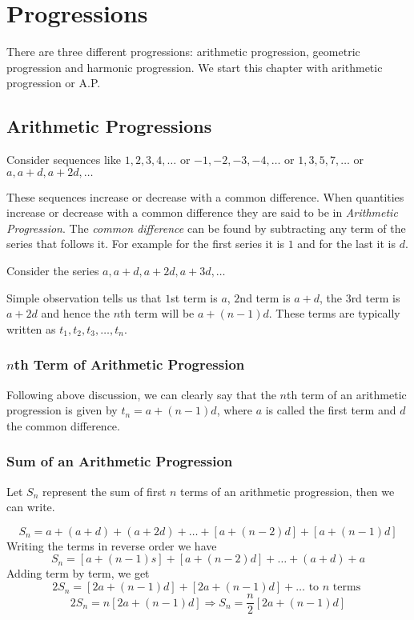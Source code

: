 \chapter{Progressions}
There are three different progressions: arithmetic progression, geometric progression and harmonic progression. We start this
chapter with arithmetic progression or A.P.

\section{Arithmetic Progressions}
Consider sequences like $1, 2, 3, 4, \ldots$ or $-1, -2, -3, -4, \ldots$ or $1, 3, 5, 7, \ldots$ or $a, a + d, a + 2d, \ldots$

These sequences increase or decrease with a common difference. When quantities increase or decrease with a common difference they
are said to be in \textit{Arithmetic Progression}. The \textit{common difference} can be found by subtracting any term of the
series that follows it. For example for the first series it is $1$ and for the last it is $d$.

Consider the series $a, a + d, a + 2d, a + 3d, \ldots$

Simple observation tells us that $1$st term is $a$, $2$nd term is $a + d$, the $3$rd term is $a + 2d$ and hence the $n$th term will
be $a + (n - 1)d$. These terms are typically written as $t_1, t_2, t_3, \ldots, t_n$.

\subsection{$n$th Term of Arithmetic Progression}
Following above discussion, we can clearly say that the $n$th term of an arithmetic progression is given by $t_n = a + (n - 1)d$,
where $a$ is called the first term and $d$ the common difference.

\subsection{Sum of an Arithmetic Progression}
Let $S_n$ represent the sum of first $n$ terms of an arithmetic progression, then we can write.

$$S_n = a + (a + d) + (a + 2d) + \ldots + [a + (n - 2)d] + [a + (n - 1)d]$$
Writing the terms in reverse order we have
$$S_n = [a + (n - 1)s] + [a + (n - 2)d] + \ldots + (a + d) + a$$
Adding term by term, we get
$$2S_n = [2a + (n - 1)d] + [2a + (n - 1)d] + \ldots\text{~to~}n\text{~terms~}$$
$$2S_n = n[2a + (n - 1)d]\Rightarrow S_n = \frac{n}{2}[2a + (n - 1)d]$$

